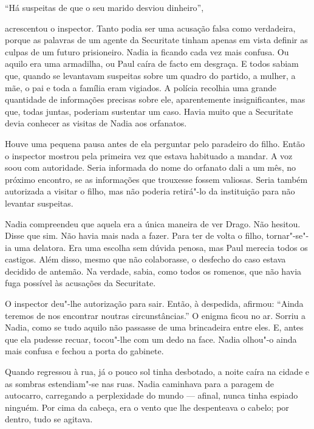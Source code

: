 ``Há suspeitas de que o seu marido desviou dinheiro'',

acrescentou o inspector. Tanto podia ser uma acusação falsa como
verdadeira, porque as palavras de um agente da Securitate tinham apenas
em vista definir as culpas de um futuro prisioneiro. Nadia ia ficando
cada vez mais confusa. Ou aquilo era uma armadilha, ou Paul caíra de
facto em desgraça. E todos sabiam que, quando se levantavam suspeitas
sobre um quadro do partido, a mulher, a
mãe, o pai e toda a família eram vigiados. A polícia recolhia uma
grande quantidade de informações precisas sobre ele, aparentemente
insignificantes, mas que, todas juntas, poderiam sustentar um caso.
Havia muito que a Securitate devia conhecer as visitas de Nadia aos
orfanatos.

Houve uma pequena pausa antes de ela perguntar pelo paradeiro do filho.
Então o inspector mostrou pela primeira vez que estava habituado a
mandar. A voz soou com autoridade. Seria informada do nome do orfanato
dali a um mês, no próximo encontro, se as informações que trouxesse
fossem valiosas. Seria também autorizada a visitar o filho, mas não
poderia retirá"-lo da instituição para não levantar suspeitas.

Nadia compreendeu que aquela era a única maneira de ver Drago. Não
hesitou. Disse que sim. Não havia mais nada a fazer. Para ter de volta o
filho, tornar"-se"-ia uma delatora. Era uma escolha sem dúvida penosa, mas
Paul merecia todos os castigos. Além disso, mesmo que não colaborasse, o
desfecho do caso estava decidido de antemão. Na verdade, sabia, como
todos os romenos, que não havia fuga possível às acusações da
Securitate.

O inspector deu"-lhe autorização para sair. Então, à despedida,
afirmou: ``Ainda teremos de nos encontrar noutras circunstâncias.'' O
enigma ficou no ar. Sorriu a Nadia, como se tudo aquilo não passasse de
uma brincadeira entre eles. E, antes que ela pudesse recuar, tocou"-lhe
com um dedo na face. Nadia olhou"-o ainda mais confusa e fechou a porta
do gabinete.

Quando regressou à rua, já o pouco sol tinha desbotado, a noite caíra
na cidade e as sombras estendiam"-se nas
ruas. Nadia caminhava para a paragem de autocarro, carregando a
perplexidade do mundo --- afinal, nunca tinha espiado ninguém. Por cima
da cabeça, era o vento que lhe despenteava o cabelo; por dentro, tudo se
agitava.

